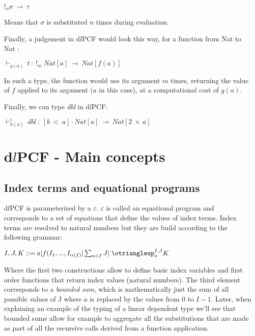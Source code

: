 \documentclass[a4paper,12pt]{article}
\begin{document}
\begin{center}
$!_{n}\sigma~\multimap~\tau$
\end{center} 

Means that $\sigma$ is substituted $n$ times during evaluation. 

\medskip

Finally, a judgement in d$l$PCF would look this way, for a function from Nat to
Nat :

\begin{center}
$\vdash_{g(a)}~t~:~!_{m}~Nat[a]~\multimap~Nat[f(a)]$ 
\end{center}

In such a type, the function would use its argument $m$ times, returning 
the value of $f$ applied to its argument ($a$ in this case), at a computational
cost of $g(a)$. 

Finally, we can type \emph{dbl} in d$l$PCF:

\begin{center}
$\vdash^{\varepsilon}_{h(a)}~dbl~:~[b~<~a] \cdot Nat[a]~\multimap~Nat[2~\times~a]$
\end{center}

\section{d$l$PCF - Main concepts}

\subsection{Index terms and equational programs}

d$l$PCF is parameterized by a $\varepsilon$. $\varepsilon$ is called an equational
program and corresponds to a set of equations that define the values of index 
terms. Index terms are resolved to natural numbers but they are build according to 
the following grammar:

\begin{center}
$I,J,K::= a | f(I_{1},...,I_{\alpha(f)} | \sum_{a<I} J |\;\otriangleup_{a}^{I,J}K $
\end{center}

Where the first two constructions allow to define basic index variables and first order
functions that return index values (natural numbers). The third element corresponds to
a \emph{bounded sum}, which is mathematically just the sum of all possible values of J 
where $a$ is replaced by the values from 0 to $I-1$. Later, when explaining an example 
of the typing of a linear dependent type we'll see that bounded sums allow for example to 
aggregate all the substitutions that are made as part of all the recursive calls derived
from a function application. 
\end{document}
